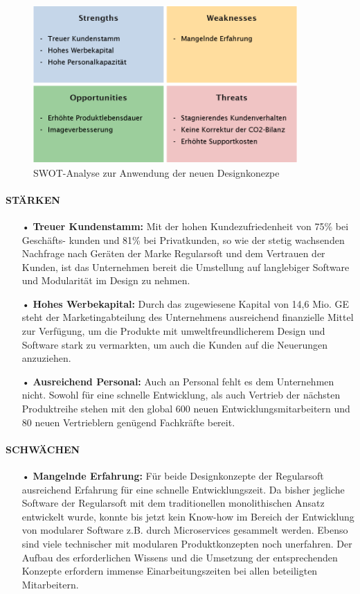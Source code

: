 \documentclass[12pt,titlepage]{article}
\begin{document}
\begin{figure}[h]
 \centering
\includegraphics[width=0.9\textwidth]{SWOT}
 \caption{SWOT-Analyse zur Anwendung der neuen Designkonezpe}
 \label{fig:SWOT-Analyse}
\end{figure}


\paragraph{STÄRKEN}
\begin{itemize}
\item[•] \textbf{Treuer Kundenstamm:} 
Mit der hohen Kundezufriedenheit von 75\% bei Geschäfts- kunden und 81\% bei Privatkunden, so wie der stetig wachsenden Nachfrage nach Geräten der Marke Regularsoft und dem Vertrauen der Kunden, ist das Unternehmen bereit die Umstellung auf langlebiger Software und Modularität im Design zu nehmen.
\item[•] \textbf{Hohes Werbekapital:} 
Durch das zugewiesene Kapital  von 14,6 Mio. GE steht der Marketingabteilung des Unternehmens ausreichend finanzielle Mittel zur Verfügung, um die Produkte mit umweltfreundlicherem Design und Software stark zu vermarkten, um auch die Kunden auf die Neuerungen anzuziehen.
\item[•] \textbf{Ausreichend Personal:}
Auch an Personal fehlt es dem Unternehmen nicht. Sowohl für eine schnelle Entwicklung, als auch Vertrieb der nächsten Produktreihe stehen mit den global 600 neuen Entwicklungsmitarbeitern und 80 neuen Vertrieblern genügend Fachkräfte bereit.
\end{itemize}

\paragraph{SCHWÄCHEN}
\begin{itemize}
\item[•] \textbf{Mangelnde Erfahrung:}
Für beide Designkonzepte der Regularsoft ausreichend Erfahrung für eine schnelle Entwicklungszeit. Da bisher jegliche Software der Regularsoft mit dem traditionellen monolithischen Ansatz entwickelt wurde, konnte bis jetzt kein Know-how im Bereich der Entwicklung von modularer Software z.B. durch Microservices gesammelt werden. Ebenso sind viele technischer mit modularen Produktkonzepten noch unerfahren. Der Aufbau des erforderlichen Wissens und die Umsetzung der entsprechenden Konzepte erfordern immense Einarbeitungszeiten bei allen beteiligten Mitarbeitern.
\end{itemize}
\end{document}
